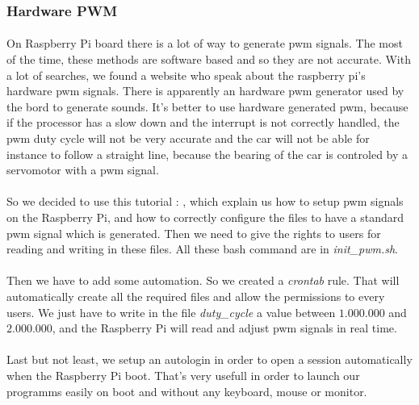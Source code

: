 \subsubsection{Hardware PWM}
\paragraph{}
On Raspberry Pi board there is a lot of way to generate pwm signals.
The most of the time, these methods are software based and so they are not
accurate. With a lot of searches, we found a website who speak about the
raspberry pi's hardware pwm signals. There is apparently an hardware pwm
generator used by the bord to generate sounds. It's better to use hardware 
generated pwm, because if the processor has a slow down and the interrupt
is not correctly handled, the pwm duty cycle will not be very accurate and
the car will not be able for instance to follow a straight line, because the
bearing of the car is controled by a servomotor with a pwm signal.

\paragraph{}So we decided to use this tutorial : \cite{pi_pwm}, 
which explain us how to setup pwm signals on the Raspberry Pi,
and how to correctly configure the files to have a standard pwm signal
which is generated. Then we need to give the rights to users for reading and
writing in these files. All these bash command are in \textit{init\_pwm.sh}.

\paragraph{}
Then we have to add some automation. So we created a \textit{crontab} rule.
That will automatically create all the required files and allow the permissions
to every users. We just have to write in the file \textit{duty\_cycle} a value between
$1.000.000$ and $2.000.000$, and the Raspberry Pi will read and adjust pwm signals
in real time.

\paragraph{}
Last but not least, we setup an autologin in order to open a session automatically
when the Raspberry Pi boot. That's very usefull in order to launch our programms
easily on boot and without any keyboard, mouse or monitor.